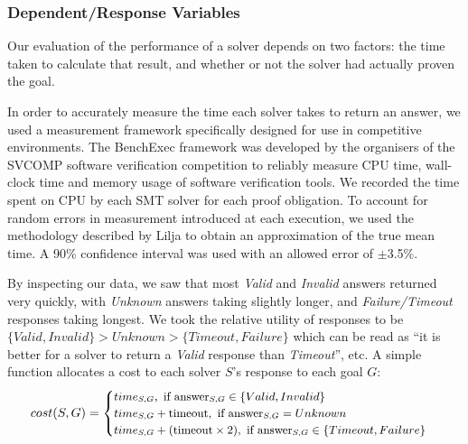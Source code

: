 \documentclass[runningheads,a4paper]{llncs}
\begin{document}


\subsubsection{Dependent/Response Variables}
\label{sec:dependant}

Our evaluation of the performance of a solver depends on two factors: the time taken to calculate that result, and whether or not the solver had actually proven the goal.

In order to accurately measure the time each solver takes to return an answer, we used a measurement framework specifically designed for use in competitive environments. The BenchExec \cite{benchexec} framework was developed by the organisers of the SVCOMP \cite{SVCOMP} software verification competition to reliably measure CPU time, wall-clock time and memory usage of software verification tools. We recorded the time spent on CPU by each SMT solver for each proof obligation. To account for random errors in measurement introduced at each execution, we used the methodology described by Lilja \cite{LiljaJ} to obtain an approximation of the true mean time. A 90\% confidence interval was used with an allowed error of $\pm$3.5\%.   

By inspecting our data, we saw that most \textit{Valid} and \textit{Invalid} answers returned very quickly, with \textit{Unknown} answers taking slightly longer, and \textit{Failure/Timeout} responses taking longest. We took the relative utility of responses to be $\lbrace Valid, Invalid\rbrace>Unknown>\lbrace Timeout,Failure\rbrace$ which can be read as ``it is better for a solver to return a \textit{Valid} response than \textit{Timeout}'', etc. A simple function allocates a cost to each solver $S$'s response to each goal $G$:
\[\small
	cost(S,G) = 
	\begin{cases}
		time_{S,G}, \text{ if answer}_{S,G} \in \lbrace Valid, Invalid \rbrace \\
		time_{S,G} + \text{timeout}, \text{ if answer}_{S,G} = Unknown \\
		time_{S,G} + (\text{timeout} \times 2), \text{ if answer}_{S,G} \in \lbrace Timeout, Failure \rbrace
	\end{cases}
\]
\end{document}
